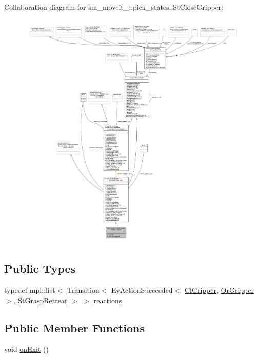 Collaboration diagram for sm\+\_\+moveit\+\_\+:\+:pick\+\_\+states\+:\+:St\+Close\+Gripper\+:
\nopagebreak
\begin{figure}[H]
\begin{center}
\leavevmode
\includegraphics[width=350pt]{structsm__moveit__4_1_1pick__states_1_1StCloseGripper__coll__graph}
\end{center}
\end{figure}
\subsection*{Public Types}
\begin{DoxyCompactItemize}
\item 
typedef mpl\+::list$<$ Transition$<$ Ev\+Action\+Succeeded$<$ \hyperlink{classsm__moveit__4_1_1cl__gripper_1_1ClGripper}{Cl\+Gripper}, \hyperlink{classsm__moveit__4_1_1OrGripper}{Or\+Gripper} $>$, \hyperlink{structsm__moveit__4_1_1pick__states_1_1StGraspRetreat}{St\+Grasp\+Retreat} $>$ $>$ \hyperlink{structsm__moveit__4_1_1pick__states_1_1StCloseGripper_a6934886ed914236301c2341e96264729}{reactions}
\end{DoxyCompactItemize}
\subsection*{Public Member Functions}
\begin{DoxyCompactItemize}
\item 
void \hyperlink{structsm__moveit__4_1_1pick__states_1_1StCloseGripper_a427f4aec6a2173899b55e6a45ca28773}{on\+Exit} ()
\end{DoxyCompactItemize}
